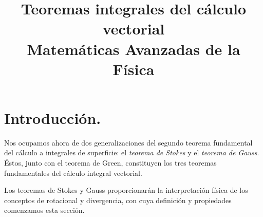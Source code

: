 
\marginsize{1.5cm}{1.5cm}{2cm}{2cm} 
\title{Teoremas integrales del cálculo vectorial \\ {\large Matemáticas Avanzadas de la Física}}
\date{ }
\author{}

\renewcommand\labelenumii{\theenumi.{\arabic{enumii}}}
\maketitle
\fontsize{14}{14}\selectfont
\vspace{-2cm}
\section{Introducción.}
Nos ocupamos ahora de dos generalizaciones del segundo teorema fundamental del cálculo a integrales de superficie: el \emph{teorema de Stokes} y el \emph{teorema de Gauss}. Éstos, junto con el teorema de Green, constituyen los tres teoremas fundamentales del cálculo integral vectorial.
\par
Los teoremas de Stokes y Gauss proporcionarán la interpretación física de los conceptos de rotacional y divergencia, con cuya definición y propiedades comenzamos esta sección.
